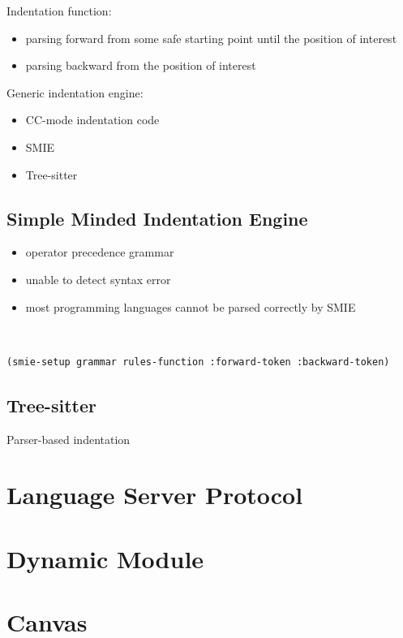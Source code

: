 \documentclass{article}
\begin{document}
Indentation function:
\begin{itemize}
    \item parsing forward from some safe starting point until the position of interest
    \item parsing backward from the position of interest
\end{itemize}

Generic indentation engine:
\begin{itemize}
    \item CC-mode indentation code
    \item SMIE
    \item Tree-sitter
\end{itemize}

\subsection{Simple Minded Indentation Engine}
\begin{itemize}
    \item operator precedence grammar
    \item unable to detect syntax error
    \item most programming languages cannot be parsed correctly by SMIE
\end{itemize}

\begin{definition}~
    \label{def:smie-setup}
    \begin{verbatim}
(smie-setup grammar rules-function :forward-token :backward-token)
\end{verbatim}
\end{definition}

\subsection{Tree-sitter}
Parser-based indentation

\section{Language Server Protocol}

\section{Dynamic Module}

\section{Canvas}

\printbibliography
\end{document}
